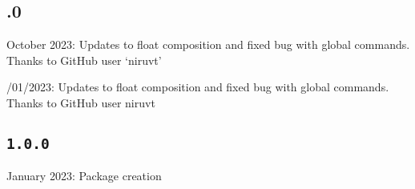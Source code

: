 \documentclass[12pt]{article}
\begin{document}
\subsection*{.0}  

 October 2023: Updates to float composition and fixed bug with global commands. Thanks to GitHub user `niruvt'

/01/2023: Updates to float composition and fixed bug with global commands. Thanks to GitHub user niruvt


\subsection*{\texttt{1.0.0}}


 January 2023: Package creation

	
\end{document}

